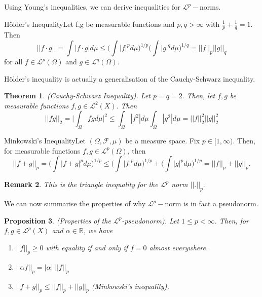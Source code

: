 \documentclass[twoside]{article}
\newcounter{lecnum}
\newtheorem{theorem}{Theorem}[lecnum]
\newtheorem{proposition}[theorem]{Proposition}
\newtheorem{remark}[theorem]{Remark}
\newcommand{\sigmalgebra}{\mathcal{F}}
\begin{document}
Using Young's inequalities, we can derive inequalities for $\mathcal{L}^p-$norms.

\begin{proposition_exam}{Hölder's Inequality}{}Let f,g be measurable functions and $p,q > \infty$ with $\frac{1}{p} + \frac{1}{q} = 1.$ Then 
$$
||f\cdot g|| = \int |f \cdot g|d\mu \leq \bigg(\int|f|^pd\mu \bigg)^{1/p}\bigg(\int|g|^qd\mu \bigg)^{1/q} = ||f||_p||g||_q
$$
for all $f \in \mathcal{L}^p(\Omega)$ and $g \in \mathcal{L}^q(\Omega).$
\end{proposition_exam}

Hölder's inequality is actually a generalisation of the Cauchy-Schwarz inequality.
\begin{theorem}(Cauchy-Schwarz Inequality). Let $p = q = 2.$ Then, let $f,g$ be measurable functions $f,g \in \mathcal{L}^2(X).$ Then 
$$
||fg||_{2} = \bigg| \int_{\Omega}fgd\mu\bigg|^2 \leq \int_{\Omega}|f^2|d\mu \int_{\Omega}|g^2|d\mu = ||f||_2^{2}||g||_{2}^{2}
$$
\end{theorem}


\begin{proposition_exam}{Minkowski's Inequality}{}Let $(\Omega, \sigmalgebra, \mu)$ be a measure space. Fix $p \in [1,\infty)$. Then, for measurable functions $f,g \in \mathcal{L}^p(\Omega)$, then 
$$
||f + g||_p = \bigg(\int |f+g|^pd\mu \bigg)^{1/p} \leq \bigg(\int |f|^pd\mu \bigg)^{1/p} + \bigg(\int |g|^pd\mu \bigg)^{1/p} = ||f||_p + ||g||_p.
$$
\end{proposition_exam}

\begin{remark}This is the triangle inequality for the $\mathcal{L}^p$ norm $||.||_p.$
\end{remark}

We can now summarise the properties of why $\mathcal{L}^p-$norm is in fact a pseudonorm.

\begin{proposition}(Properties of the $\mathcal{L}^p$-pseudonorm). Let $1 \leq p < \infty$. Then, for $f,g \in \mathcal{L}^p(X)$ and $\alpha \in \mathbb{R}$, we have 
\begin{enumerate}
\item $||f||_p \geq 0$ with equality if and only if $f = 0$ almost everywhere.
\item $||\alpha f ||_p = |\alpha| \;||f||_p$
\item $||f + g||_p \leq ||f||_p + ||g||_p$ (Minkowski's inequality).
\end{enumerate}
\end{proposition}
\end{document}

